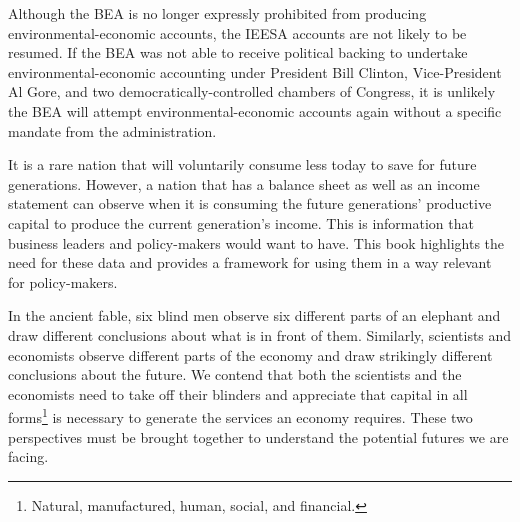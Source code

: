 Although the BEA is no longer expressly prohibited from producing environmental-economic accounts, the IEESA accounts are not likely to be resumed. If the BEA was not able to receive political backing to undertake environmental-economic accounting under President Bill Clinton, Vice-President Al Gore, and two democratically-controlled chambers of Congress, it is unlikely the BEA will attempt environmental-economic accounts again without a specific mandate from the administration. 

It is a rare nation that will voluntarily consume less today to save for future generations. However, a nation that has a balance sheet as well as an income statement can observe when it is consuming the future generations' productive capital to produce the current generation's income. This is information that business leaders and policy-makers would want to have. This book highlights the need for these data and provides a framework for using them in a way relevant for policy-makers.

In the ancient fable, six blind men observe six different parts of an elephant and draw different conclusions about what is in front of them. Similarly, scientists and economists observe different parts of the economy and draw strikingly different conclusions about the future. We contend that both the scientists and the economists need to take off their blinders and appreciate that capital in all forms\footnote{Natural, manufactured, human, social, and financial.} is necessary to generate the services an economy requires. These two perspectives must be brought together to understand the potential futures we are facing. 













